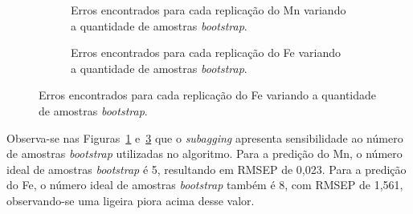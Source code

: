 \begin{figure}[htbp]
\centering
\caption{RMSEP em função das replicações \textit{bootstrap} para RLM-\textit{subagging}.}
\label{fig:Figura45} %

\begin{subfigure}{0.48\textwidth}
\centering
{}
\caption{Erros encontrados para cada replicação do Mn variando a quantidade de amostras \textit{bootstrap}.}
\label{fig:Figura44a}
\end{subfigure}
\hfill
\begin{subfigure}{0.48\textwidth}
\centering
{}
\caption{Erros encontrados para cada replicação do Fe variando a quantidade de amostras \textit{bootstrap}.}
\label{fig:Figura44b} %
\end{subfigure}
\end{figure}


Observa-se nas Figuras~\ref{fig:Figura44a} e~\ref{fig:Figura44b} que o \textit{subagging} apresenta sensibilidade ao número de amostras \textit{bootstrap} utilizadas no algoritmo. Para a predição do Mn, o número ideal de amostras \textit{bootstrap} é 5, resultando em RMSEP de 0,023. Para a predição do Fe, o número ideal de amostras \textit{bootstrap} também é 8, com RMSEP de 1,561, observando-se uma ligeira piora acima desse valor.


